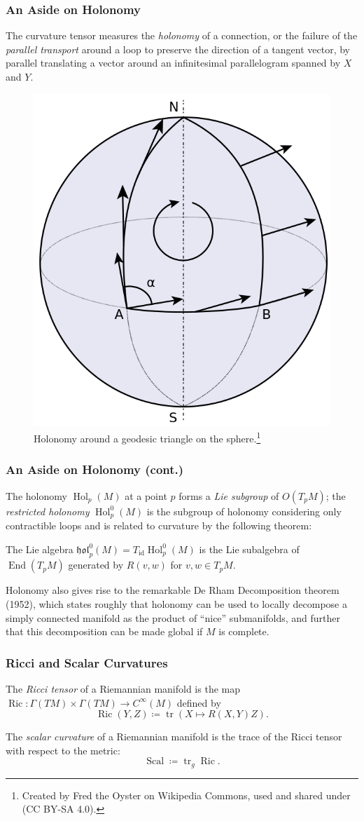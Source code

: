 \documentclass{beamer}
\DeclareMathOperator{\End}{End}
\DeclareMathOperator{\id}{id}
\DeclareMathOperator{\trace}{tr}
\DeclareMathOperator{\Hol}{Hol}
\DeclareMathOperator{\Ric}{Ric}
\DeclareMathOperator{\Scal}{Scal}
\theoremstyle{definition}
\begin{document}
\begin{frame}
    \frametitle{An Aside on Holonomy}

    The curvature tensor measures the \emph{holonomy} of a connection,
    or the failure of the \emph{parallel transport} around a loop to preserve
    the direction of a tangent vector, by parallel translating a vector around
    an infinitesimal parallelogram spanned by $X$ and $Y$.
    \begin{figure}
        \centering
        \includegraphics[width=.25\textwidth]{images/Parallel_Transport.svg.png}
        \caption{Holonomy around a geodesic triangle on the sphere.\footnote{Created
        by Fred the Oyster on Wikipedia Commons, used and shared under (CC BY-SA 4.0).}}
    \end{figure}
\end{frame}

\begin{frame}
    \frametitle{An Aside on Holonomy (cont.)}

    The holonomy $\Hol_p(M)$ at a point $p$ forms a \emph{Lie subgroup} of $O(T_pM)$;
    the \emph{restricted holonomy} $\Hol_p^0(M)$ is the subgroup of holonomy considering
    only contractible loops and is related to curvature by the following theorem:
    \begin{theorem}
        The Lie algebra $\mathfrak{hol}_p^0(M) = T_{\id}\Hol_p^0(M)$ is the Lie subalgebra
        of $\End(T_pM)$ generated by $R(v,w)$ for $v, w \in T_pM$.
    \end{theorem}

    Holonomy also gives rise to the remarkable De Rham Decomposition theorem (1952),
    which states roughly that holonomy can be used to locally decompose a simply
    connected manifold as the product of ``nice'' submanifolds, and further that
    this decomposition can be made global if $M$ is complete.
\end{frame}

\begin{frame}
    \frametitle{Ricci and Scalar Curvatures}

    \begin{definition}
        The \emph{Ricci tensor} of a Riemannian manifold is the map
        $\Ric : \Gamma(TM) \times \Gamma(TM) \to C^\infty(M)$ defined by
        \[
            \Ric(Y,Z) \coloneqq \trace(X \mapsto R(X,Y)Z).
        \]
    \end{definition}

    \begin{definition}
        The \emph{scalar curvature} of a Riemannian manifold is the trace of the
        Ricci tensor with respect to the metric:
        \[
          \Scal \coloneqq \trace_g \Ric.
        \]
    \end{definition}
\end{frame}
\end{document}
